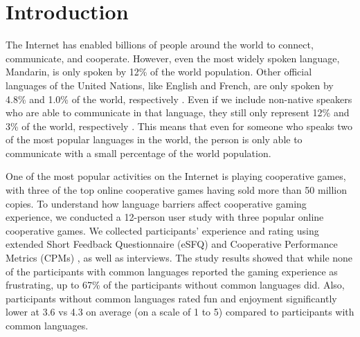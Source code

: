 \section{Introduction}

The Internet has enabled billions of people around the world to connect, communicate, and cooperate. However, even the most widely spoken language, Mandarin, is only spoken by 12\% of the world population. 
Other official languages of the United Nations, like English and French, are only spoken by 4.8\% and 1.0\% of the world, respectively \cite{I1}. 
Even if we include non-native speakers who are able to communicate in that language, they still only represent 12\% and 3\% of the world, respectively \cite{I2,I3}. This means that even for someone who speaks two of the most popular languages in the world, the person is only able to communicate with a small percentage of the world population.

One of the most popular activities on the Internet is playing cooperative games, with three of the top online cooperative games having sold more than 50 million copies. To understand how language barriers affect cooperative gaming experience, we conducted a 12-person user study with three popular online cooperative games. We collected participants' experience and rating using extended Short Feedback Questionnaire (eSFQ) \cite{eSFQ} and Cooperative Performance Metrics (CPMs) \cite{CPMs}, as well as interviews. The study results showed that while none of the participants with common languages reported the gaming experience as frustrating, up to 67\% of the participants without common languages did. Also, participants without common languages rated fun and enjoyment significantly lower at 3.6 vs 4.3 on average (on a scale of 1 to 5) compared to participants with common languages. 

%
%

